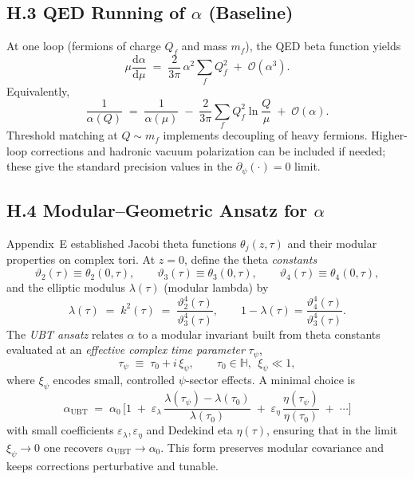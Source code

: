 \subsection*{H.3 QED Running of $\alpha$ (Baseline)}
At one loop (fermions of charge $Q_f$ and mass $m_f$), the QED beta function yields
\begin{equation}
\mu \frac{\mathrm{d}\alpha}{\mathrm{d}\mu} \;=\; \frac{2}{3\pi}\,\alpha^2 \sum_f Q_f^2 \;+\; \mathcal{O}(\alpha^3).
\end{equation}
Equivalently,
\begin{equation}
\frac{1}{\alpha(Q)} \;=\; \frac{1}{\alpha(\mu)} \;-\; \frac{2}{3\pi}\sum_f Q_f^2 \ln\!\frac{Q}{\mu} \;+\; \mathcal{O}(\alpha).
\end{equation}
Threshold matching at $Q\sim m_f$ implements decoupling of heavy fermions.
Higher-loop corrections and hadronic vacuum polarization can be included if needed; these give the standard precision values in the $\partial_\psi(\cdot)=0$ limit.

\subsection*{H.4 Modular--Geometric Ansatz for $\alpha$}
Appendix~E established Jacobi theta functions $\theta_j(z,\tau)$ and their modular properties on complex tori. 
At $z=0$, define the theta \emph{constants}
\begin{equation}
\vartheta_2(\tau) \equiv \theta_2(0,\tau), \qquad
\vartheta_3(\tau) \equiv \theta_3(0,\tau), \qquad
\vartheta_4(\tau) \equiv \theta_4(0,\tau),
\end{equation}
and the elliptic modulus $\lambda(\tau)$ (modular lambda) by
\begin{equation}
\lambda(\tau) \;=\; k^2(\tau) \;=\; \frac{\vartheta_2^4(\tau)}{\vartheta_3^4(\tau)}, \qquad 1-\lambda(\tau)=\frac{\vartheta_4^4(\tau)}{\vartheta_3^4(\tau)}.
\end{equation}
The \emph{UBT ansatz} relates $\alpha$ to a modular invariant built from theta constants evaluated at an \emph{effective complex time parameter} $\tau_\psi$,
\begin{equation}
\tau_\psi \;\equiv\; \tau_0 + i\,\xi_\psi, \qquad \tau_0 \in \mathbb{H},\ \ \xi_\psi \ll 1,
\end{equation}
where $\xi_\psi$ encodes small, controlled $\psi$-sector effects. 
A minimal choice is
\begin{equation}
\boxed{\quad \alpha_{\mathrm{UBT}} \;=\; \alpha_0 \,\Bigg[ 1 \;+\; \varepsilon_\lambda\,
\frac{\lambda(\tau_\psi)-\lambda(\tau_0)}{\lambda(\tau_0)} \;+\; \varepsilon_\eta\,
\frac{\eta(\tau_\psi)}{\eta(\tau_0)} \;+\; \cdots \Bigg] \quad}
\label{eq:alpha_modular}
\end{equation}
with small coefficients $\varepsilon_{\lambda},\varepsilon_{\eta}$ and Dedekind eta $\eta(\tau)$, ensuring that in the limit $\xi_\psi \to 0$ one recovers $\alpha_{\mathrm{UBT}}\to \alpha_0$.
This form preserves modular covariance and keeps corrections perturbative and tunable.


